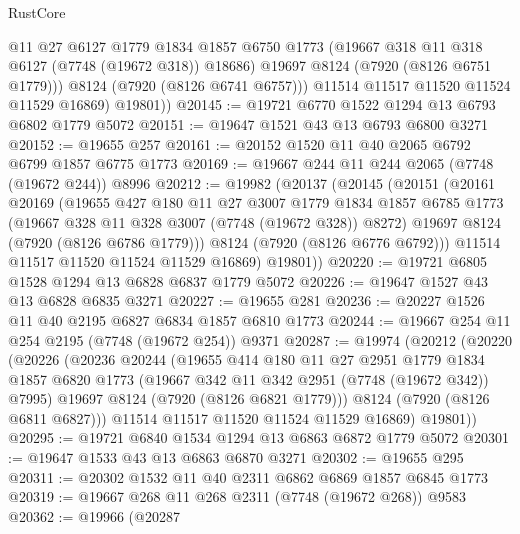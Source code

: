 \begin{lexlean}{RustCore}
\begin{coremodule}
              @11
              @27
              @6127
              @1779
              @1834
              @1857
              @6750
              @1773
              (@19667 @318 @11 @318 @6127 (@7748 (@19672 @318)) @18686)
              @19697
              @8124
              (@7920 (@8126 @6751 @1779)))
            @8124
            (@7920 (@8126 @6741 @6757)))
          @11514
          @11517
          @11520
          @11524
          @11529
          @16869)
        @19801))
@20145 := @19721 @6770 @1522 @1294 @13 @6793 @6802 @1779 @5072
@20151 := @19647 @1521 @43 @13 @6793 @6800 @3271
@20152 := @19655 @257
@20161 := @20152 @1520 @11 @40 @2065 @6792 @6799 @1857 @6775 @1773
@20169 := @19667 @244 @11 @244 @2065 (@7748 (@19672 @244)) @8996
@20212 := @19982
    (@20137
      (@20145
        (@20151
          (@20161
            @20169
            (@19655
              @427
              @180
              @11
              @27
              @3007
              @1779
              @1834
              @1857
              @6785
              @1773
              (@19667 @328 @11 @328 @3007 (@7748 (@19672 @328)) @8272)
              @19697
              @8124
              (@7920 (@8126 @6786 @1779)))
            @8124
            (@7920 (@8126 @6776 @6792)))
          @11514
          @11517
          @11520
          @11524
          @11529
          @16869)
        @19801))
@20220 := @19721 @6805 @1528 @1294 @13 @6828 @6837 @1779 @5072
@20226 := @19647 @1527 @43 @13 @6828 @6835 @3271
@20227 := @19655 @281
@20236 := @20227 @1526 @11 @40 @2195 @6827 @6834 @1857 @6810 @1773
@20244 := @19667 @254 @11 @254 @2195 (@7748 (@19672 @254)) @9371
@20287 := @19974
    (@20212
      (@20220
        (@20226
          (@20236
            @20244
            (@19655
              @414
              @180
              @11
              @27
              @2951
              @1779
              @1834
              @1857
              @6820
              @1773
              (@19667 @342 @11 @342 @2951 (@7748 (@19672 @342)) @7995)
              @19697
              @8124
              (@7920 (@8126 @6821 @1779)))
            @8124
            (@7920 (@8126 @6811 @6827)))
          @11514
          @11517
          @11520
          @11524
          @11529
          @16869)
        @19801))
@20295 := @19721 @6840 @1534 @1294 @13 @6863 @6872 @1779 @5072
@20301 := @19647 @1533 @43 @13 @6863 @6870 @3271
@20302 := @19655 @295
@20311 := @20302 @1532 @11 @40 @2311 @6862 @6869 @1857 @6845 @1773
@20319 := @19667 @268 @11 @268 @2311 (@7748 (@19672 @268)) @9583
@20362 := @19966
    (@20287

\end{coremodule}
\end{lexlean}
